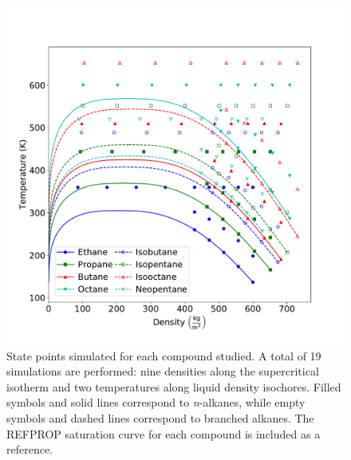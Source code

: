 \documentclass[journal=jctc,manuscript=article]{achemso}
\begin{document}
\begin{figure}[htb!]
	\centering
	\includegraphics[width=6.4in]{simulation_conditions}
	\caption{State points simulated for each compound studied. A total of 19 simulations are performed: nine densities along the supercritical isotherm and two temperatures along liquid density isochores. Filled symbols and solid lines correspond to \textit{n}-alkanes, while empty symbols and dashed lines correspond to branched alkanes. The REFPROP saturation curve for each compound is included as a reference.}
	\label{fig:simulation_conditions}
\end{figure}
\end{document}
